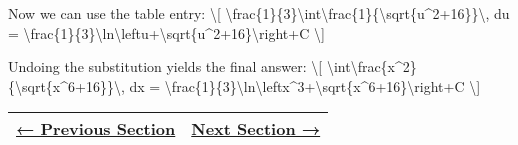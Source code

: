 Now we can use the table entry: \textbackslash{}{[}
\textbackslash{}frac\{1\}\{3\}\textbackslash{}int\textbackslash{}frac\{1\}\{\textbackslash{}sqrt\{u\^{}2+16\}\}\textbackslash{},
du =
\textbackslash{}frac\{1\}\{3\}\textbackslash{}ln\textbackslash{}left\textbar{}u+\textbackslash{}sqrt\{u\^{}2+16\}\textbackslash{}right\textbar{}+C
\textbackslash{}{]}

Undoing the substitution yields the final answer: \textbackslash{}{[}
\textbackslash{}int\textbackslash{}frac\{x\^{}2\}\{\textbackslash{}sqrt\{x\^{}6+16\}\}\textbackslash{},
dx =
\textbackslash{}frac\{1\}\{3\}\textbackslash{}ln\textbackslash{}left\textbar{}x\^{}3+\textbackslash{}sqrt\{x\^{}6+16\}\textbackslash{}right\textbar{}+C
\textbackslash{}{]}

\begin{longtable}[]{@{}ll@{}}
\toprule
\endhead
\href{section3-4.php}{← Previous Section} & \href{section3-6.php}{Next
Section →}\tabularnewline
\bottomrule
\end{longtable}
